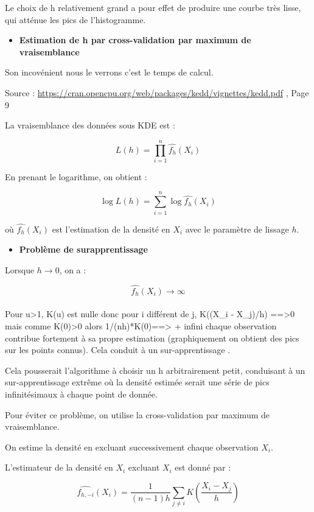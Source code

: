 \documentclass[
  12pt,
]{article}
\providecommand{\tightlist}{%
  \setlength{\itemsep}{0pt}\setlength{\parskip}{0pt}}
\begin{document}
Le choix de h relativement grand a pour effet de produire une courbe
très lisse, qui atténue les pics de l'histogramme.

\begin{itemize}
\tightlist
\item
  \textbf{Estimation de h par cross-validation par maximum de
  vraisemblance}
\end{itemize}

Son incovénient nous le verrons c'est le temps de calcul.

Source :
\url{https://cran.opencpu.org/web/packages/kedd/vignettes/kedd.pdf} ,
Page 9

La vraisemblance des données sous KDE est :

\[
L(h) = \prod_{i=1}^n \hat{f_h}(X_i)
\]

En prenant le logarithme, on obtient :

\[
\log L(h) = \sum_{i=1}^n \log \hat{f_h}(X_i)
\]

où \(\hat{f_h}(X_i)\) est l'estimation de la densité en \(X_i\) avec le
paramètre de lissage \(h\).

\begin{itemize}
\tightlist
\item
  \textbf{Problème de surapprentissage}
\end{itemize}

Lorsque \(h \to 0\), on a :

\[
\hat{f_h}(X_i) \to \infty
\]\\

Pour u\textgreater1, K(u) est nulle donc pour i différent de j, K((X\_i
- X\_j)/h) ==\textgreater0 mais comme K(0)\textgreater0 alors
1/(nh)*K(0)==\textgreater{} + infini chaque observation contribue
fortement à sa propre estimation (graphiquement on obtient des pics sur
les points connus). Cela conduit à un sur-apprentissage .

Cela pousserait l'algorithme à choisir un h arbitrairement petit,
conduisant à un sur-apprentissage extrême où la densité estimée serait
une série de pics infinitésimaux à chaque point de donnée.

Pour éviter ce problème, on utilise la cross-validation par maximum de
vraisemblance.

On estime la densité en excluant successivement chaque observation
\(X_i\).

L'estimateur de la densité en \(X_i\) excluant \(X_i\) est donné par :

\[
\hat{f_{h,-i}}(X_i) = \frac{1}{(n-1)h} \sum_{j \ne i} K\left(\frac{X_i - X_j}{h}\right)
\]
\end{document}
